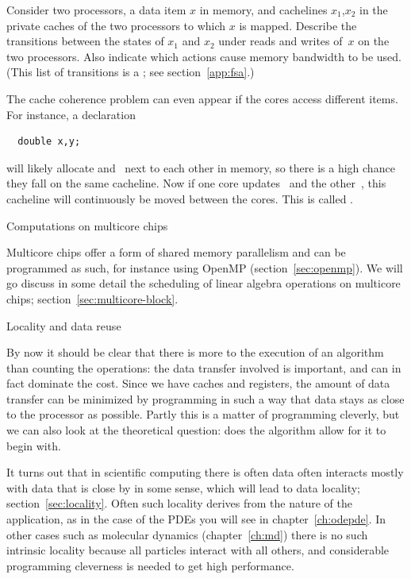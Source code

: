\begin{exercise}
  Consider two processors, a data item $x$ in memory, and cachelines
  $x_1$,$x_2$ in the private caches of the two processors to which $x$
  is mapped. Describe the transitions between the states of $x_1$ and
  $x_2$ under reads and writes of~$x$ on the two processors. Also
  indicate which actions cause memory bandwidth to be used. (This list
  of transitions is a ; see section~\ref{app:fsa}.)
\end{exercise}

The cache coherence problem can even appear if the cores access
different items. For instance, a declaration
\begin{verbatim}
  double x,y;
\end{verbatim}
will likely allocate  and~ next to each other in memory, so
there is a high chance they fall on the same cacheline. Now if one
core updates~ and the other~, this cacheline will
continuously be moved between the cores. This is called
.


 {Computations on multicore chips}

Multicore chips offer a form of shared memory parallelism and can be
programmed as such, for instance using OpenMP
(section~\ref{sec:openmp}). We will go discuss in some detail the
scheduling of linear algebra operations on multicore chips;
section~\ref{sec:multicore-block}.


 {Locality and data reuse}

By now it should be clear that there is more to the execution of an
algorithm than counting the operations: the data transfer involved is
important, and can in fact dominate the cost. Since we have caches and
registers, the amount of data transfer can be minimized by programming
in such a way that data stays as close to the processor as
possible. Partly this is a matter of programming cleverly, but we can
also look at the theoretical question: does the algorithm allow for it
to begin with.

It turns out that in scientific computing there is often data often
interacts mostly with data that is close by in some sense, which will
lead to data locality; section~\ref{sec:locality}. Often such locality
derives from the nature of the application, as in the case of the \acp{PDE} you
will see in chapter~\ref{ch:odepde}. In other cases such as molecular
dynamics (chapter~\ref{ch:md}) there is no such intrinsic locality
because all particles interact with all others,
and considerable programming cleverness is needed to get high performance.

